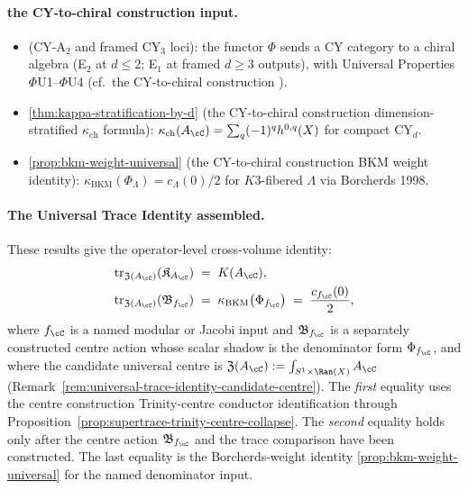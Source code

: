 \paragraph{the CY-to-chiral construction input.}
\begin{itemize}
 \item \cite{VolI} (CY-A$_2$ and framed CY$_3$ loci): the functor
 $\Phi$ sends a CY category to a chiral algebra (E$_2$ at
 $d \leq 2$; E$_1$ at framed $d \geq 3$ outputs), with Universal Properties
 $\Phi$U1--$\Phi$U4 (cf.\ the CY-to-chiral construction \cite{VolI}).
 \item \ref{thm:kappa-stratification-by-d} (the CY-to-chiral construction dimension-stratified
 $\kappa_{\mathrm{ch}}$ formula): $\kappa_{\mathrm{ch}}(A_\cC)
 = \sum_q (-1)^q h^{0,q}(X)$ for compact CY$_d$.
 \item \ref{prop:bkm-weight-universal} (the CY-to-chiral construction BKM weight identity):
 $\kappa_{\mathrm{BKM}}(\Phi_\Lambda) = c_\Lambda(0)/2$
 for $K3$-fibered $\Lambda$ via Borcherds 1998.
\end{itemize}

\paragraph{The Universal Trace Identity assembled.}
These results give the operator-level cross-volume identity:
\begin{equation}
\label{eq:universal-trace-master-arrow}
 \begin{aligned}
 \mathrm{tr}_{\mathfrak{Z}(A_\cC)}(\mathfrak{K}_{A_\cC})
 &\;=\; K(A_\cC),\\
 \mathrm{tr}_{\mathfrak{Z}(A_\cC)}(\mathfrak{B}_{f_\cC})
 &\;=\; \kappa_{\mathrm{BKM}}\bigl(\Phi_{f_\cC}\bigr)
 \;=\; \frac{c_{f_\cC}(0)}{2},
 \end{aligned}
\end{equation}
where \(f_\cC\) is a named modular or Jacobi input and
\(\mathfrak B_{f_\cC}\) is a separately constructed centre action whose
scalar shadow is the denominator form \(\Phi_{f_\cC}\), and where the
candidate universal centre is
$\mathfrak{Z}(A_\cC) := \int_{S^1 \times \Ran(X)} A_\cC$
(Remark~\ref{rem:universal-trace-identity-candidate-centre}). The
\emph{first} equality uses the centre construction Trinity-centre conductor
identification through
Proposition~\ref{prop:supertrace-trinity-centre-collapse}. The
\emph{second} equality holds only after the centre action
\(\mathfrak B_{f_\cC}\) and the trace comparison have been constructed.
The last equality is the Borcherds-weight identity
\ref{prop:bkm-weight-universal} for the named denominator input.

